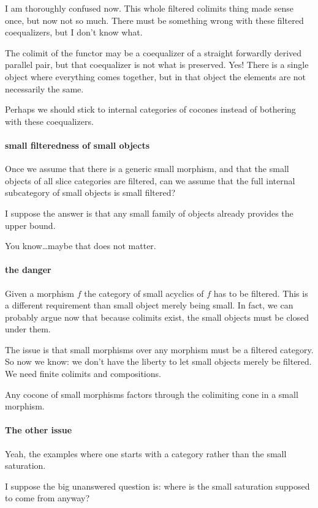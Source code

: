 \documentclass[csh.tex]{subfiles}
\begin{document}
I am thoroughly confused now. This whole filtered colimits thing made sense once, but now not so much. There must be something wrong with these filtered coequalizers, but I don't know what.

The colimit of the functor may be a coequalizer of a straight forwardly derived parallel pair, but that coequalizer is not what is preserved.
Yes! There is a single object where everything comes together, but in that object the elements are not necessarily the same.

Perhaps we should stick to internal categories of cocones instead of bothering with these coequalizers.

\paragraph{small filteredness of small objects}
Once we assume that there is a generic small morphism, and that the small objects of all slice categories are filtered, can we assume that the full internal subcategory of small objects is small filtered?

I suppose the answer is that any small family of objects already provides the upper bound.

You know\dots maybe that does not matter.
\paragraph{the danger}
Given a morphism $f$ the category of small acyclics of $f$ has to be filtered. This is a different requirement than small object merely being small. In fact, we can probably argue now that because colimits exist, the small objects must be closed under them.

The issue is that small morphisms over any morphism must be a filtered category. So now we know: we don't have the liberty to let small objects merely be filtered. We need finite colimits and compositions.

Any cocone of small morphisms factors through the colimiting cone in a small morphism.

\paragraph{The other issue}
Yeah, the examples where one starts with a category rather than the small saturation.

I suppose the big unanswered question is: where is the small saturation supposed to come from anyway?
\end{document}
